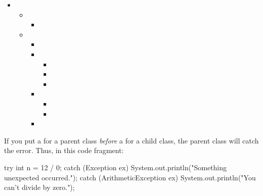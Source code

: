 \begin{itemize}
    \item {}
        \begin {itemize}
            \item {}
                \begin{itemize}
                    \item {}
                \end{itemize}
            \item {}
            \begin {itemize}
                \item {}
                \item {}
                    \begin{itemize}
                        \item {}
                        \item {}
                        \item {}
                    \end{itemize}
                \item {}
                    \begin{itemize}
                        \item {}
                        \item {}
                    \end{itemize}
                \item {}
              \end{itemize}
    \end{itemize}
\end{itemize}

If you put a  for a parent class {\em before} a  for a child class, the parent class will catch the error.
Thus, in this code fragment:

\begin{code}
try {
    int n = 12 / 0;
}
catch (Exception ex) {
    System.out.println("Something unexpected occurred.");
}
catch (ArithmeticException ex) {
    System.out.println("You can't divide by zero.");
}
\end{code}

